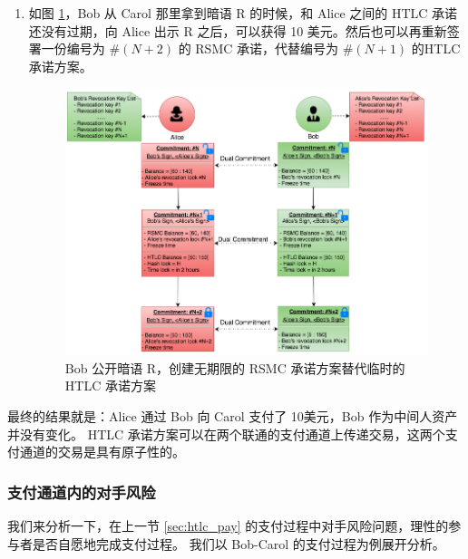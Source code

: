 \begin{enumerate}
    \item 如图 \ref{fig:htlc_alice_bob_3}，Bob 从 Carol 那里拿到暗语 R 的时候，和 Alice 之间的 HTLC 承诺还没有过期，向 Alice 出示 R 之后，可以获得 10 美元。然后也可以再重新签署一份编号为 $\#(N+2)$ 的 RSMC 承诺，代替编号为 $\#(N+1)$ 的HTLC 承诺方案。
        \begin{figure}[h!]
            \centering
            \includegraphics[width=12cm, keepaspectratio]{../images/alice_bob_3.png}
            \caption{Bob 公开暗语 R，创建无期限的 RSMC 承诺方案替代临时的 HTLC 承诺方案}
            \label{fig:htlc_alice_bob_3}
        \end{figure}
\end{enumerate}

最终的结果就是：Alice 通过 Bob 向 Carol 支付了 10美元，Bob 作为中间人资产并没有变化。
HTLC 承诺方案可以在两个联通的支付通道上传递交易，这两个支付通道的交易是具有原子性的。

\subsubsection{支付通道内的对手风险}
我们来分析一下，在上一节 \ref{sec:htlc_pay} 的支付过程中对手风险问题，理性的参与者是否自愿地完成支付过程。
我们以 Bob-Carol 的支付过程为例展开分析。


